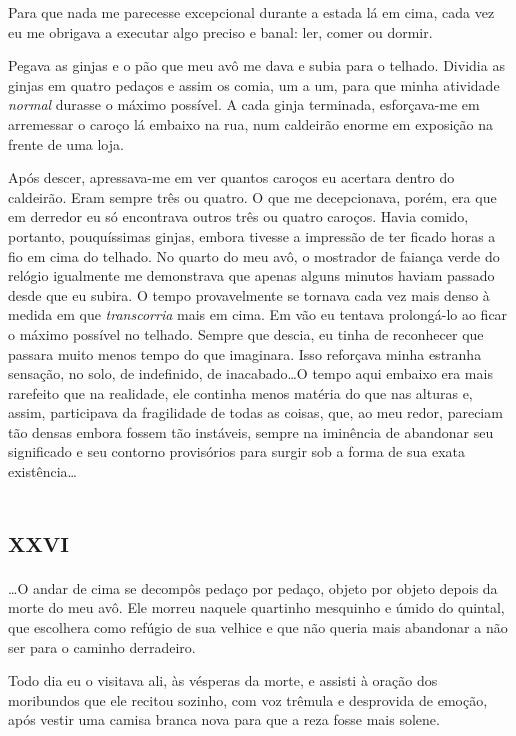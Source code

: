 Para que nada me parecesse excepcional durante a estada lá em cima, cada vez eu me obrigava a executar algo preciso e banal: ler, comer ou dormir.

Pegava as ginjas e o pão que meu avô me dava e subia para o telhado. Dividia as ginjas em quatro pedaços e assim os comia, um a um, para que minha atividade \textit{normal} durasse o máximo possível. A cada ginja terminada, esforçava-me em arremessar o caroço lá embaixo na rua, num caldeirão enorme em exposição na frente de uma loja.

Após descer, apressava-me em ver quantos caroços eu acertara dentro do caldeirão. Eram sempre três ou quatro. O que me decepcionava, porém, era que em derredor eu só encontrava outros três ou quatro caroços. Havia comido, portanto, pouquíssimas ginjas, embora tivesse a impressão de ter ficado horas a fio em cima do telhado. No quarto do meu avô, o mostrador de faiança verde do relógio igualmente me demonstrava que apenas alguns minutos haviam passado desde que eu subira. O tempo provavelmente se tornava cada vez mais denso à medida em que \textit{transcorria} mais em cima. Em vão eu tentava prolongá-lo ao ficar o máximo possível no telhado. Sempre que descia, eu tinha de reconhecer que passara muito menos tempo do que imaginara. Isso reforçava minha estranha sensação, no solo, de indefinido, de inacabado\dots O tempo aqui embaixo era mais rarefeito que na realidade, ele continha menos matéria do que nas alturas e, assim, participava da fragilidade de todas as coisas, que, ao meu redor, pareciam tão densas embora fossem tão instáveis, sempre na iminência de abandonar seu significado e seu contorno provisórios para surgir sob a forma de sua exata existência\dots


\chapter*{\huge\centering\textsc{xxvi}}

\dots O andar de cima se decompôs pedaço por pedaço, objeto por objeto depois da morte do meu avô. Ele morreu naquele quartinho mesquinho e úmido do quintal, que escolhera como refúgio de sua velhice e que não queria mais abandonar a não ser para o caminho derradeiro.

Todo dia eu o visitava ali, às vésperas da morte, e assisti à oração dos moribundos que ele recitou sozinho, com voz trêmula e desprovida de emoção, após vestir uma camisa branca nova para que a reza fosse mais solene.


